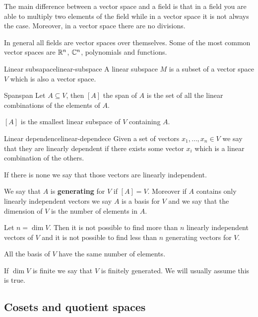 \documentclass[12pt]{extarticle}
\begin{document}
The main difference between a vector space and a field is that in a field you are able to multiply two elements of the field while in a vector space it is not always the case. Moreover, in a vector space there are no divisions.

In general all fields are vector spaces over themselves.
Some of the most common vector spaces are $\mathbb{R}^n$, $\mathbb{C}^n$, polynomials and functions.

\begin{definition}{Linear subsapace}{linear-subspace}
    A linear subspace $M$ is a subset of a vector space $V$ which is also a vector space.
\end{definition}

\begin{definition}{Span}{span}
    Let $A \subseteq V$, then $[A]$ the span of $A$ is the set of all the linear combinations of the elements of $A$.
\end{definition}

\begin{lemma}{}{}
    $[A]$ is the smallest linear subspace of $V$ containing $A$.
\end{lemma}

\begin{definition}{Linear dependence}{linear-dependece}
    Given a set of vectors $x_1, \dots, x_n \in V$ we say that they are linearly dependent if there exists some vector $x_i$ which is a linear combination of the others.

    If there is none we say that those vectors are linearly independent.
\end{definition}

We say that $A$ is \textbf{generating} for $V$ if $[A] = V$. Moreover if $A$ contains only linearly independent vectors we say $A$ is a basis for $V$ and we say that the dimension of $V$ is the number of elements in $A$.

\begin{theorem}{}{}
    Let $n = \dim V$. Then it is not possible to find more than $n$ linearly independent vectors of $V$ and it is not possible to find less than $n$ generating vectors for $V$.

    All the basis of $V$ have the same number of elements.
\end{theorem}

If $\dim V$ is finite we say that $V$ is finitely generated. We will usually assume this is true.

\subsection{Cosets and quotient spaces}
\end{document}
